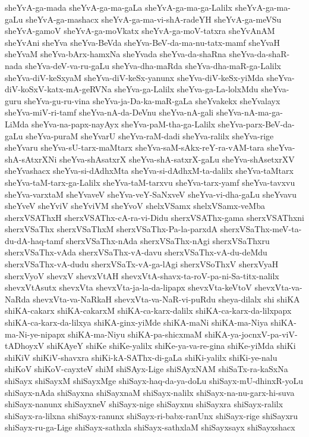 {sheYvA-ga-mada
sheYvA-ga-ma-gaLa
sheYvA-ga-ma-ga-Lalilx
sheYvA-ga-ma-gaLu
sheYvA-ga-mashacx
sheYvA-ga-ma-vi-shA-radeYH
sheYvA-ga-meVSu
sheYvA-gamoV
sheYvA-ga-moVkatx
sheYvA-ga-moV-tatxra
sheYvAnAM
sheYvAni
sheYva
sheYva-BeVda
sheYva-BeV-da-ma-nu-tatx-mamf
sheYvaH
sheYvaM
sheYva-bArx-hamxNa
sheYvada
sheYva-da-shaRna
sheYva-da-shaR-nada
sheYva-deV-va-ru-gaLu
sheYva-dha-maRda
sheYva-dha-maR-ga-Lalilx
sheYva-diV-keSxyaM
sheYva-diV-keSx-yanunx
sheYva-diV-keSx-yiMda
sheYva-diV-koSxV-katx-mA-geRVNa
sheYva-ga-Lalilx
sheYva-ga-La-lolxMdu
sheYva-guru
sheYva-gu-ru-vina
sheYva-ja-Da-ka-maR-gaLa
sheYvakekx
sheYvalayx
sheYva-miV-ri-tamf
sheYva-nA-da-DeVnu
sheYva-nA-gali
sheYva-nA-ma-ga-LiMda
sheYva-na-papx-nayAyx
sheYva-paM-tha-ga-Lalilx
sheYva-parx-BeV-da-gaLu
sheYva-puraM
sheYvarU
sheYva-raM-dadi
sheYva-ralilx
sheYva-rige
sheYvaru
sheYva-sU-tarx-maMtarx
sheYva-saM-sAkx-reY-ra-vAM-tara
sheYva-shA-sAtxrXNi
sheYva-shAsatxrX
sheYva-shA-satxrX-gaLu
sheYva-shAsetxrXV
sheYvashacx
sheYva-si-dAdhxMta
sheYva-si-dAdhxM-ta-dalilx
sheYva-taMtarx
sheYva-taM-tarx-ga-Lalilx
sheYva-taM-tarxvu
sheYva-tarx-yamf
sheYva-tavxvu
sheYva-varxtaM
sheYvaveV
sheYva-veY-SaNxveV
sheYva-vi-dha-gaLu
sheYvavu
sheYveV
sheYviV
sheYviVM
sheYvoV
shelxVSamx
shelxVSamx-veMba
sherxVSAThxH
sherxVSAThx-cA-ra-vi-Didu
sherxVSAThx-gama
sherxVSAThxni
sherxVSaThx
sherxVSaThxM
sherxVSaThx-Pa-la-parxdA
sherxVSaThx-meV-ta-du-dA-haq-tamf
sherxVSaThx-nAda
sherxVSaThx-nAgi
sherxVSaThxru
sherxVSaThx-vAda
sherxVSaThx-vA-davu
sherxVSaThx-vA-du-deMdu
sherxVSaThx-vA-dudu
sherxVSaTx-vA-ga-lAgi
sherxVSoThxV
sherxVyaH
sherxVyoV
shevxV
shevxVtAH
shevxVtA-shavx-ta-roV-pa-ni-Sa-titx-nalilx
shevxVtAsutx
shevxVta
shevxVta-ja-la-da-lipapx
shevxVta-keVtoV
shevxVta-va-NaRda
shevxVta-va-NaRkaH
shevxVta-va-NaR-vi-puRdu
sheya-dilalx
shi
shiKA
shiKA-cakarx
shiKA-cakarxM
shiKA-ca-karx-dalilx
shiKA-ca-karx-da-lilxpapx
shiKA-ca-karx-da-lilxya
shiKA-ginx-yiMde
shiKA-maNi
shiKA-ma-Niya
shiKA-ma-Ni-ye-nipapx
shiKA-ma-Niyu
shiKA-pa-shicxmaM
shiKA-ya-jocnxV-pa-viV-tADhoyxV
shiKAyeY
shiKe
shiKe-yalilx
shiKe-ya-va-re-gina
shiKe-yiMda
shiKi
shiKiV
shiKiV-shavxra
shiKi-kA-SAThx-di-gaLa
shiKi-yalilx
shiKi-ye-nalu
shiKoV
shiKoV-cayxteV
shiM
shiSAyx-Lige
shiSAyxNAM
shiSaTx-ra-kaSxNa
shiSayx
shiSayxM
shiSayxMge
shiSayx-haq-da-ya-doLu
shiSayx-mU-dhinxR-yoLu
shiSayx-nAda
shiSayxna
shiSayxnaM
shiSayx-nalilx
shiSayx-na-nu-garx-hi-suva
shiSayx-nanunx
shiSayxneV
shiSayx-nige
shiSayxnu
shiSayxra
shiSayx-ralilx
shiSayx-ra-lilxna
shiSayx-ranunx
shiSayx-ri-babx-ranUnx
shiSayx-rige
shiSayxru
shiSayx-ru-ga-Lige
shiSayx-sathxla
shiSayx-sathxlaM
shiSayxsayx
shiSayxshacx
}
